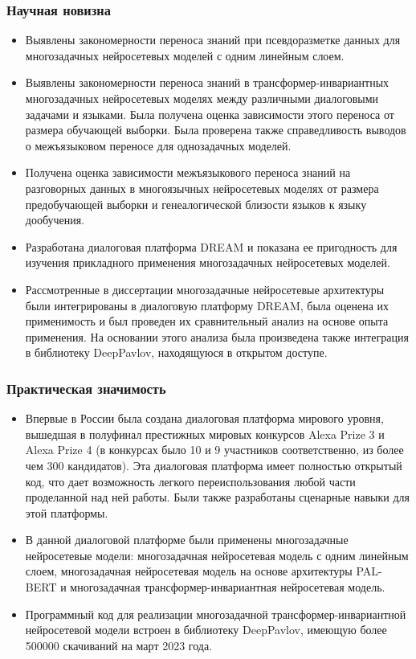 \begin{frame}
    \frametitle{Научная новизна}
    \begin{itemize}
  \item {Выявлены закономерности переноса знаний при псевдоразметке данных для многозадачных нейросетевых моделей с одним линейным слоем.}
  \item {Выявлены закономерности переноса знаний в трансформер-инвариантных многозадачных нейросетевых моделях между различными диалоговыми задачами и языками. Была получена оценка зависимости этого переноса от размера обучающей выборки. Была проверена также справедливость выводов о межъязыковом переносе для однозадачных моделей.}
  \item {Получена оценка зависимости межъязыкового переноса знаний на разговорных данных в многоязычных нейросетевых моделях от размера предобучающей выборки и генеалогической близости языков к языку дообучения.}
  \item {Разработана диалоговая платформа DREAM и показана ее пригодность для изучения прикладного применения многозадачных нейросетевых моделей.}
  \item {Рассмотренные в диссертации многозадачные нейросетевые архитектуры были интегрированы в диалоговую платформу DREAM, была оценена их применимость и был проведен их сравнительный анализ на основе опыта применения. На основании этого анализа была произведена также интеграция в библиотеку DeepPavlov, находящуюся в открытом доступе.}
    \end{itemize}
\end{frame}
\note{
}

\begin{frame}
    \frametitle{Практическая значимость}
    \begin{itemize}
   \item Впервые в России была создана диалоговая платформа мирового уровня, вышедшая в полуфинал престижных мировых конкурсов Alexa Prize 3 и Alexa Prize 4 (в конкурсах было 10 и 9 участников соответственно, из более чем 300 кандидатов). Эта диалоговая платформа имеет полностью открытый код, что дает возможность легкого переиспользования любой части проделанной над ней работы. Были также разработаны сценарные навыки для этой платформы.
   \item В данной диалоговой платформе были применены многозадачные нейросетевые модели: многозадачная нейросетевая модель с одним линейным слоем, многозадачная нейросетевая модель на основе архитектуры PAL-BERT и многозадачная трансформер-инвариантная нейросетевая модель.
   \item Программный код для реализации многозадачной трансформер-инвариантной нейросетевой модели встроен в библиотеку DeepPavlov, имеющую более 500000 скачиваний на март 2023 года.
    \end{itemize}
\end{frame}
\note{
}


